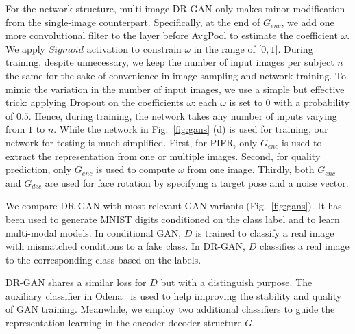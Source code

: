 \documentclass[10pt,journal,compsoc]{IEEEtran}
\begin{document}
For the network structure, multi-image DR-GAN only makes minor modification from the single-image counterpart.
Specifically, at the end of $G_{enc}$, we add one more convolutional filter to the layer before AvgPool to estimate the coefficient $\omega$. 
We apply $Sigmoid$ activation to constrain $\omega$ in the range of [$0,1$]. 
During training, despite unnecessary,  we keep the number of input images per subject $n$ the same for the sake of convenience in image sampling and network training.
To mimic the variation in the number of input images, we use a simple but effective trick: applying Dropout on the coefficients $\omega$: each $\omega$ is set to $0$ with a probability of $0.5$. 
Hence, during training, the network takes any number of inputs varying from $1$ to $n$. 
While the network in Fig.~\ref{fig:gans} (d) is used for training, our network for testing is much simplified. 
First, for PIFR, only $G_{enc}$ is used to extract the representation from one or multiple images. 
Second, for quality prediction, only $G_{enc}$ is used to compute $\omega$ from one image.
Thirdly, both $G_{enc}$ and $G_{dec}$ are used for face rotation by specifying a target pose and a noise vector. 

\label{sec:gans}
We compare DR-GAN with most relevant GAN variants (Fig.~\ref{fig:gans}).
It has been used to generate MNIST digits conditioned on the class label and to learn multi-modal models. 
In conditional GAN, $D$ is trained to classify a real image with mismatched conditions to a fake class. 
In DR-GAN, $D$ classifies a real image to the corresponding class based on the labels. 

DR-GAN shares a similar loss for $D$ but with a distinguish purpose. The auxiliary classifier in Odena\etal~\cite{odena2017conditional} is used to help improving the stability and quality of GAN training. Meanwhile, we employ two additional classifiers to guide the representation learning in the encoder-decoder structure $G$.
\end{document}
